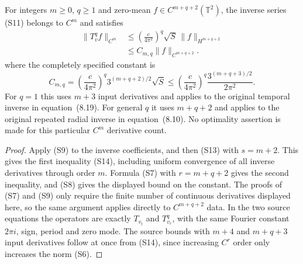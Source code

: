 \begin{theorem}
\label{thm:ns-cm-improvement}
For integers $m\geq0$, $q\geq1$ and zero-mean
$f\in C^{m+q+2}(\mathbb T^2)$, the inverse series (S11) belongs
to $C^m$ and satisfies
\[
 \begin{aligned}
 \|T_v^qf\|_{C^m}
   &\leq\left(\frac c{4\pi^2}\right)^q
             \sqrt S\,\|f\|_{H^{m+q+2}}\\
   &\leq C_{m,q}\|f\|_{C^{m+q+2}}.
 \end{aligned}                                                   \tag{S14}
\]
where the completely specified constant is
\[
 C_{m,q}=\left(\frac c{4\pi^2}\right)^q
          3^{(m+q+2)/2}\sqrt S
 \leq\left(\frac c{4\pi^2}\right)^q
          \frac{3^{(m+q+3)/2}}{2\pi^2}.             \tag{S15}
\]
For $q=1$ this uses $m+3$ input derivatives and applies to the
original temporal inverse in equation~(8.19). For general $q$ it
uses $m+q+2$ and applies to the original repeated radial inverse
in equation~(8.10). No optimality assertion is made for this
particular $C^m$ derivative count.
\end{theorem}
\begin{proof}
Apply (S9) to the inverse coefficients, and then (S13) with
$s=m+2$. This gives the first inequality (S14), including uniform
convergence of all inverse derivatives through order $m$.
Formula (S7) with $r=m+q+2$ gives the second inequality, and
(S8) gives the displayed bound on the constant. The proofs of
(S7) and (S9) only require the finite number of continuous
derivatives displayed here, so the same argument applies directly
to $C^{m+q+2}$ data. In the two source equations the operators
are exactly $T_{v_t}$ and $T_{v_r}^q$, with the same Fourier
constant $2\pi i$, sign, period and zero mode. The source bounds
with $m+4$ and $m+q+3$ input derivatives follow at once from
(S14), since increasing $C^r$ order only increases the norm (S6).
\end{proof}

